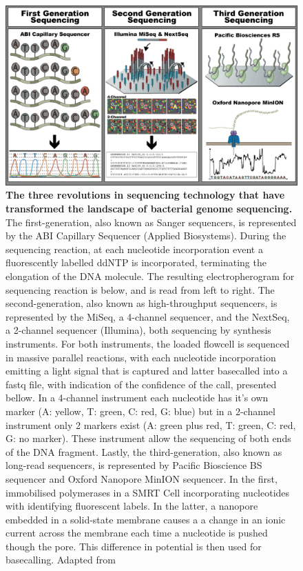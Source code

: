 \begin{figure}[h!]
\centering
\includegraphics[width=\textwidth]{figures/introduction/Figure 3.png}
\caption{\textbf{The three revolutions in sequencing technology that have transformed the landscape of bacterial genome sequencing.} The first-generation, also known as Sanger sequencers, is represented by the ABI Capillary Sequencer (Applied Biosystems). During the sequencing reaction, at each nucleotide incorporation event a fluorescently labelled ddNTP is incorporated, terminating the elongation of the DNA molecule. The resulting electropherogram for sequencing reaction is below, and is read from left to right. The second-generation, also known as high-throughput sequencers, is represented by the MiSeq, a 4-channel sequencer, and the NextSeq, a 2-channel sequencer (Illumina), both sequencing by synthesis instruments. For both instruments, the loaded flowcell is sequenced in massive parallel reactions, with each nucleotide incorporation emitting a light signal that is captured and latter basecalled into a fastq file, with indication of the confidence of the call, presented bellow. In a 4-channel instrument each nucleotide has it's own marker (A: yellow, T: green, C: red, G: blue) but in a 2-channel instrument only 2 markers exist (A: green plus red, T: green, C: red, G: no marker). These instrument allow the sequencing of both ends of the DNA fragment. Lastly, the third-generation, also known as long-read sequencers, is represented by Pacific Bioscience BS sequencer and Oxford Nanopore MinION sequencer. In the first, immobilised polymerases in a SMRT Cell incorporating nucleotides with identifying fluorescent labels. In the latter, a nanopore embedded in a solid-state membrane causes a a change in an ionic current across the membrane each time a nucleotide is pushed though the pore. This difference in potential is then used for basecalling. Adapted from \cite{hagemann_overview_2015, loman_twenty_2015,goodwin_coming_2016, wang_nanopore_2021, metzker_sequencing_2010, xu_recent_2020}}
\label{fig:figure3}
\end{figure}

